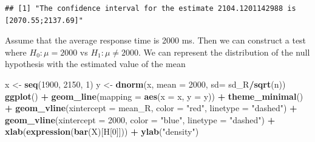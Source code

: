 \documentclass[
]{article}
\newenvironment{Shaded}{\begin{snugshade}}{\end{snugshade}}
\newcommand{\AttributeTok}[1]{\textcolor[rgb]{0.13,0.29,0.53}{#1}}
\newcommand{\DecValTok}[1]{\textcolor[rgb]{0.00,0.00,0.81}{#1}}
\newcommand{\FunctionTok}[1]{\textcolor[rgb]{0.13,0.29,0.53}{\textbf{#1}}}
\newcommand{\NormalTok}[1]{#1}
\newcommand{\OtherTok}[1]{\textcolor[rgb]{0.56,0.35,0.01}{#1}}
\newcommand{\SpecialCharTok}[1]{\textcolor[rgb]{0.81,0.36,0.00}{\textbf{#1}}}
\newcommand{\StringTok}[1]{\textcolor[rgb]{0.31,0.60,0.02}{#1}}
\begin{document}
\begin{verbatim}
## [1] "The confidence interval for the estimate 2104.1201142988 is [2070.55;2137.69]"
\end{verbatim}

Assume that the average response time is 2000 ms. Then we can construct
a test where \(H_0: \mu = 2000\) vs \(H_1: \mu \not= 2000\). We can
represent the distribution of the null hypothesis with the estimated
value of the mean

\begin{Shaded}
\begin{Highlighting}[]
\NormalTok{x }\OtherTok{\textless{}{-}} \FunctionTok{seq}\NormalTok{(}\DecValTok{1900}\NormalTok{, }\DecValTok{2150}\NormalTok{, }\DecValTok{1}\NormalTok{)}
\NormalTok{y }\OtherTok{\textless{}{-}} \FunctionTok{dnorm}\NormalTok{(x, }\AttributeTok{mean =} \DecValTok{2000}\NormalTok{, }\AttributeTok{sd=}\NormalTok{ sd\_R}\SpecialCharTok{/}\FunctionTok{sqrt}\NormalTok{(n))}
 \FunctionTok{ggplot}\NormalTok{() }\SpecialCharTok{+} 
   \FunctionTok{geom\_line}\NormalTok{(}\AttributeTok{mapping =} \FunctionTok{aes}\NormalTok{(}\AttributeTok{x =}\NormalTok{ x, }\AttributeTok{y =}\NormalTok{ y)) }\SpecialCharTok{+} 
   \FunctionTok{theme\_minimal}\NormalTok{() }\SpecialCharTok{+} 
   \FunctionTok{geom\_vline}\NormalTok{(}\AttributeTok{xintercept =}\NormalTok{ mean\_R, }\AttributeTok{color =} \StringTok{"red"}\NormalTok{, }\AttributeTok{linetype =} \StringTok{"dashed"}\NormalTok{) }\SpecialCharTok{+} 
   \FunctionTok{geom\_vline}\NormalTok{(}\AttributeTok{xintercept =} \DecValTok{2000}\NormalTok{, }\AttributeTok{color =} \StringTok{"blue"}\NormalTok{, }\AttributeTok{linetype =} \StringTok{"dashed"}\NormalTok{) }\SpecialCharTok{+}
    \FunctionTok{xlab}\NormalTok{(}\FunctionTok{expression}\NormalTok{(}\FunctionTok{bar}\NormalTok{(X)[H[}\DecValTok{0}\NormalTok{]])) }\SpecialCharTok{+}
   \FunctionTok{ylab}\NormalTok{(}\StringTok{"density"}\NormalTok{)}
\end{Highlighting}
\end{Shaded}
\end{document}
